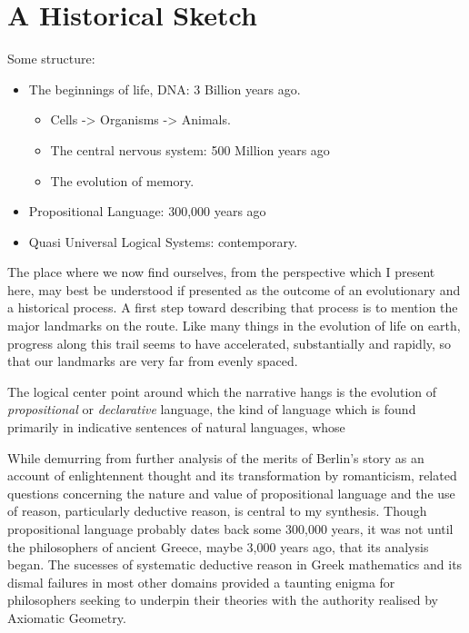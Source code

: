 \section{A Historical Sketch}

Some structure:

\begin{itemize}
\item The beginnings of life, DNA: 3 Billion years ago.
\begin{itemize}
\item Cells -> Organisms -> Animals.
\item The central nervous system: 500 Million years ago
\item The evolution of memory.
\end{itemize}
\item Propositional Language: 300,000 years ago
\item Quasi Universal Logical Systems: contemporary.
\end{itemize}

The place where we now find ourselves, from the perspective which I present here, may best be understood if presented as the outcome of an evolutionary and a historical process.
A first step toward describing that process is to mention the major landmarks on the route.
Like many things in the evolution of life on earth, progress along this trail seems to have accelerated, substantially and rapidly, so that our landmarks are very far from evenly spaced.

The logical center point around which the narrative hangs is the evolution of \emph{propositional} or \emph{declarative} language, the kind of language which is found primarily in indicative sentences of natural languages, whose 



While demurring from further analysis of the merits of Berlin's story as an account of enlightennent thought and its transformation by romanticism, related questions concerning the nature and value of propositional language and the use of reason, particularly deductive reason, is central to my synthesis.
Though propositional language probably dates back some 300,000 years, it was not until the philosophers of ancient Greece, maybe 3,000 years ago, that its analysis began.
The sucesses of systematic deductive reason in Greek mathematics and its dismal failures in most other domains provided a taunting enigma for philosophers seeking to underpin their theories with the authority realised by Axiomatic Geometry.
